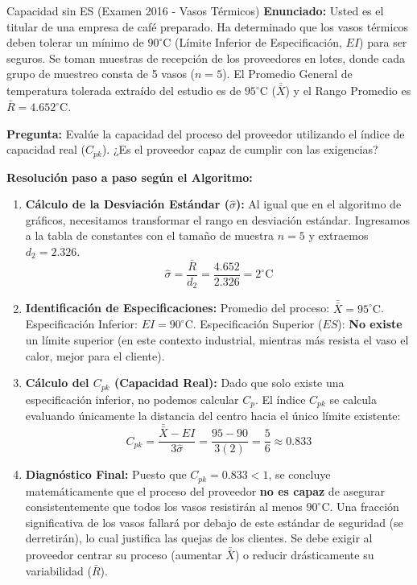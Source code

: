 \vspace{0.4cm}
\begin{ejercicio}{Capacidad sin ES (Examen 2016 - Vasos Térmicos)}
\textbf{Enunciado:} Usted es el titular de una empresa de café preparado. Ha determinado que los vasos térmicos deben tolerar un mínimo de $90^\circ\text{C}$ (Límite Inferior de Especificación, $EI$) para ser seguros. Se toman muestras de recepción de los proveedores en lotes, donde cada grupo de muestreo consta de 5 vasos ($n=5$). El Promedio General de temperatura tolerada extraído del estudio es de $95^\circ\text{C}$ ($\bar{\bar{X}}$) y el Rango Promedio es $\bar{R} = 4.652^\circ\text{C}$.

\textbf{Pregunta:} Evalúe la capacidad del proceso del proveedor utilizando el índice de capacidad real ($C_{pk}$). ¿Es el proveedor capaz de cumplir con las exigencias?

\textbf{Resolución paso a paso según el Algoritmo:}
\begin{enumerate}
    \item \textbf{Cálculo de la Desviación Estándar ($\hat{\sigma}$):} 
    Al igual que en el algoritmo de gráficos, necesitamos transformar el rango en desviación estándar. Ingresamos a la tabla de constantes con el tamaño de muestra $n=5$ y extraemos $d_2 = 2.326$.
    $$ \hat{\sigma} = \frac{\bar{R}}{d_2} = \frac{4.652}{2.326} = 2^\circ\text{C} $$
    \item \textbf{Identificación de Especificaciones:} 
    Promedio del proceso: $\bar{\bar{X}} = 95^\circ\text{C}$. Especificación Inferior: $EI = 90^\circ\text{C}$. 
    Especificación Superior ($ES$): \textbf{No existe} un límite superior (en este contexto industrial, mientras más resista el vaso el calor, mejor para el cliente).
    \item \textbf{Cálculo del $C_{pk}$ (Capacidad Real):} Dado que solo existe una especificación inferior, no podemos calcular $C_p$. El índice $C_{pk}$ se calcula evaluando únicamente la distancia del centro hacia el único límite existente:
    $$ C_{pk} = \frac{\bar{\bar{X}} - EI}{3\hat{\sigma}} = \frac{95 - 90}{3(2)} = \frac{5}{6} \approx 0.833 $$
    \item \textbf{Diagnóstico Final:} 
    Puesto que $C_{pk} = 0.833 < 1$, se concluye matemáticamente que el proceso del proveedor \textbf{no es capaz} de asegurar consistentemente que todos los vasos resistirán al menos $90^\circ\text{C}$. Una fracción significativa de los vasos fallará por debajo de este estándar de seguridad (se derretirán), lo cual justifica las quejas de los clientes. Se debe exigir al proveedor centrar su proceso (aumentar $\bar{\bar{X}}$) o reducir drásticamente su variabilidad ($\bar{R}$).
\end{enumerate}
\end{ejercicio}
